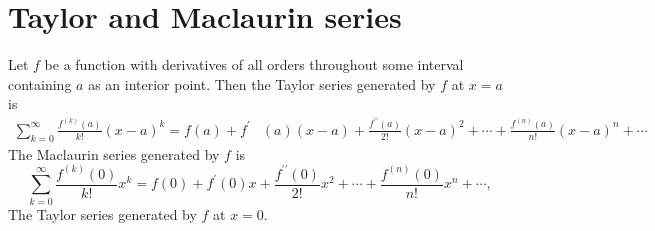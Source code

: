 \section{Taylor and Maclaurin series}
\begin{definition}
	Let $f$ be a function with derivatives of all orders throughout some interval containing $a$ as an interior point. Then the Taylor series generated by $f$ at $x=a$ is
	$$
	\begin{aligned}
	\sum_{k=0}^{\infty} \frac{f^{(k)}(a)}{k !}(x-a)^{k}=f(a)+f^{\prime} &(a)(x-a)+\frac{f^{\prime \prime}(a)}{2 !}(x-a)^{2} +\cdots+\frac{f^{(n)}(a)}{n !}(x-a)^{n}+\cdots
	\end{aligned}
	$$
	The Maclaurin series generated by $f$ is
	$$
	\sum_{k=0}^{\infty} \frac{f^{(k)}(0)}{k !} x^{k}=f(0)+f^{\prime}(0) x+\frac{f^{\prime \prime}(0)}{2 !} x^{2}+\cdots+\frac{f^{(n)}(0)}{n !} x^{n}+\cdots,
	$$
	The Taylor series generated by $f$ at $x=0$.
\end{definition}
